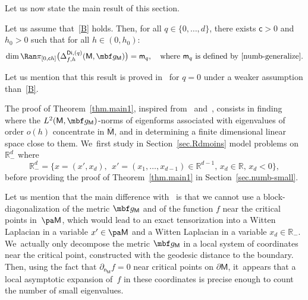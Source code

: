 Let us now state the main result of this section.
\begin{theorem}\label{thm.main1}
Let us assume that~\ref{B} holds. Then, for all $q\in \{0,\ldots,d\}$, there exists $\mathsf c>0$ and $h_0>0$ such that for all $h\in (0,h_0)$:\vspace*{-3pt}
\[
\dim \Ran \pi_{[0,\mathsf ch]}\bigl(\Delta_{f,h}^{\mathsf{Di},(q)}(\mathsf M,\mbf g_{\mathsf M})\bigr)=\mathsf m_q, \quad \text{where $\mathsf m_q$ is defined by~\eqref{numb-generalize}}.
\]
\end{theorem}

Let us mention that this result is proved in~\cite{DoNe2} for $q=0$ under a weaker assumption than~\ref{B}.

The proof of Theorem~\ref{thm.main1}, inspired from~\cite[\S 3]{helffer-nier-06} and~\cite{CFKS}, consists in finding where the $L^2(\mathsf
M,\mbf g_{\mathsf M})$-norms of eigenforms associated with eigenvalues
of order $o(h)$ concentrate in $\overline{\mathsf M}$, and in
determining a finite dimensional linear space close to them. We~first
study in
Section~\ref{sec.Rdmoins} model problems on $\mathbb R^{d}_-$ where\vspace*{-3pt}
\[
\mathbb
R^d_-=\{x=(x',x_d),\ \ x'=(x_1,\ldots,x_{d-1})\in \mathbb R^{d-1}, \,
x_d\in \mathbb R, \, x_d<0\},
\]
before providing the proof of Theorem~\ref{thm.main1} in Section~\ref{sec.numb-small}.

\begin{remark}\label{rem:numb-small}
Let us mention that the main difference with~\cite[Chap.\,3]{helffer-nier-06}
is that we cannot use a block-diagonalization of the metric $\mbf
g_{\mathsf M}$ and of the function $f$ near the critical points
in~$\pa \mathsf M$, which would lead to an exact tensorization into a Witten Laplacian in a variable $x'\in \pa \mathsf M$ and a Witten
Laplacian in a variable $x_d\in \mathbb R_-$. We~actually only decompose the metric $\mbf g_{\mathsf
M}$ in a local system of coordinates near the critical point,
constructed with the geodesic distance to the boundary. Then, using the
fact that $\partial_{\mathsf n_{\mathsf
M}}f=0$ near critical points on $\partial \mathsf M$, it~appears that a local
asymptotic expansion of~$f$ in these coordinates is precise enough to count the number of small eigenvalues.
\end{remark}

